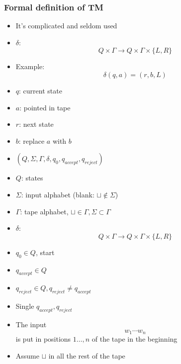 \begin{frame}[allowframebreaks] \frametitle{Formal definition of TM}
  \begin{itemize}
\item It's complicated and seldom used
\item $\delta$:
  \begin{equation*}
  Q\times \Gamma\rightarrow 
Q\times \Gamma \times\{L,R\}
\end{equation*}
\item Example:
  \begin{equation*}
  \delta(q,a) = (r,b,L)
\end{equation*}
\item [] $q$: current state

\item [] $a$: pointed in tape

\item [] $r$: next state

\item [] $b$: replace $a$ with $b$
\item $(Q,\Sigma, \Gamma, \delta, q_0, q_{accept},
q_{reject})$

\item [] $Q$: states

\item [] $\Sigma$: input alphabet (blank: $\sqcup \notin \Sigma$)

\item [] $\Gamma$: tape alphabet, $\sqcup \in \Gamma, 
\Sigma \subset \Gamma$

\item [] $\delta$:
  \begin{equation*}
  Q\times \Gamma \rightarrow
Q \times \Gamma \times 
\{L,R\}
\end{equation*}
\item [] $q_0 \in Q$, start

\item [] $q_{accept} \in Q$

\item [] $q_{reject} \in Q, q_{reject} \neq q_{accept}$

\item [] Single $q_{accept}, q_{reject}$

\item The input
  \begin{equation*}
  w_1\cdots w_n
\end{equation*}
is put in 
  positions $1 \ldots, n$ of the tape in the beginning

\item [] Assume $\sqcup$ in all the rest of the tape
  
\end{itemize}\end{frame}

